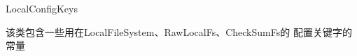 \begin{XeClass}{LocalConfigKeys}
   
 该类包含一些用在LocalFileSystem、RawLocalFs、CheckSumFs的
 配置关键字的常量

\end{XeClass}
